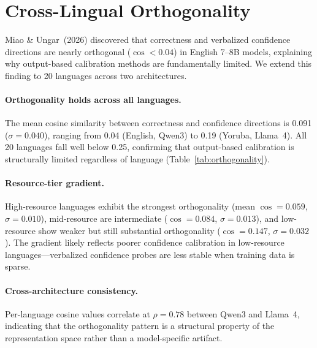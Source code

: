 \documentclass[11pt,a4paper]{article}
\begin{document}
\section{Cross-Lingual Orthogonality}
\label{sec:orthogonality}

Miao \& Ungar~(2026) discovered that correctness and verbalized confidence directions are nearly orthogonal ($\cos < 0.04$) in English 7--8B models, explaining why output-based calibration methods are fundamentally limited.
We extend this finding to 20 languages across two architectures.

\paragraph{Orthogonality holds across all languages.}
The mean cosine similarity between correctness and confidence directions is 0.091 ($\sigma = 0.040$), ranging from 0.04 (English, Qwen3) to 0.19 (Yoruba, Llama~4).
All 20 languages fall well below 0.25, confirming that output-based calibration is structurally limited regardless of language (Table~\ref{tab:orthogonality}).

\paragraph{Resource-tier gradient.}
High-resource languages exhibit the strongest orthogonality (mean $\cos = 0.059$, $\sigma = 0.010$), mid-resource are intermediate ($\cos = 0.084$, $\sigma = 0.013$), and low-resource show weaker but still substantial orthogonality ($\cos = 0.147$, $\sigma = 0.032$).
The gradient likely reflects poorer confidence calibration in low-resource languages---verbalized confidence probes are less stable when training data is sparse.

\paragraph{Cross-architecture consistency.}
Per-language cosine values correlate at $\rho = 0.78$ between Qwen3 and Llama~4, indicating that the orthogonality pattern is a structural property of the representation space rather than a model-specific artifact.
\end{document}
